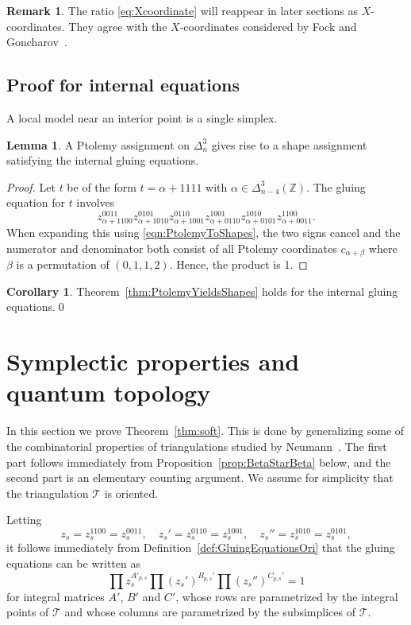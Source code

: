 \documentclass[12pt]{amsart}
\theoremstyle{definition}
\newtheorem{lemma}[theorem]{Lemma}
\newtheorem{remark}[theorem]{Remark}
\newtheorem{corollary}[theorem]{Corollary}
\numberwithin{equation}{section}
\def\Z{\mathbb{Z}}
\def\T{\mathcal{T}}
\begin{document}
\begin{remark}
The ratio \eqref{eq:Xcoordinate} will reappear in later sections as $X$-coordinates. They agree with the $X$-coordinates considered by Fock and Goncharov~\cite{FockGoncharov}. 
\end{remark}


\subsection{Proof for internal equations} \label{subsection:ProofForInternalEqn}
A local model near an interior point is a single simplex.
\begin{lemma}\label{lemma:InternalEquation} A Ptolemy assignment on $\Delta^3_n$ gives rise to a shape assignment satisfying the internal gluing equations.
\end{lemma}
\begin{proof}
Let $t$ be of the form $t=\alpha+1111$ with $\alpha\in\Delta^{3}_{n-4}(\Z)$. The gluing equation for $t$ involves
\begin{equation}
z^{0011}_{\alpha+1100}  z^{0101}_{\alpha+1010}    z^{0110}_{\alpha+1001}    z^{1001}_{\alpha+0110}     z^{1010}_{\alpha+0101}    z^{1100}_{\alpha+0011}.
\end{equation}
When expanding this using \eqref{eqn:PtolemyToShapes}, the two signs cancel and the numerator and denominator both consist of all Ptolemy coordinates $c_{\alpha+\beta}$ where $\beta$ is a permutation of $(0,1,1,2)$. Hence, the product is 1.
\end{proof}
\begin{corollary}
Theorem~\ref{thm:PtolemyYieldsShapes} holds for the internal gluing equations.\qed
\end{corollary}


\section{Symplectic properties and quantum topology}\label{sec:Symplectic}
In this section we prove Theorem~\ref{thm:soft}. This is done by generalizing some of the combinatorial properties of triangulations studied by Neumann~\cite{NeumannComb}. The first part follows immediately from Proposition~\ref{prop:BetaStarBeta} below, and the second part is an elementary counting argument. We assume for simplicity that the triangulation $\T$ is oriented. 

Letting
\begin{equation}
z_s=z_s^{1100}=z_s^{0011},\quad z_s'=z_s^{0110}=z_s^{1001},\quad z_s''=z_s^{1010}=z_s^{0101},
\end{equation}
it follows immediately from Definition~\ref{def:GluingEquationsOri} that the gluing equations can be written as 
\begin{equation}\label{eq:Unsimplified}
\prod z_s^{A'_{p,s}}\prod (z_s')^{B_{p,s}'}\prod (z_s'')^{C_{p,s}'}=1
\end{equation}
for integral matrices $A'$, $B'$ and $C'$, whose rows are parametrized by the integral points of $\T$ and whose columns are parametrized by the subsimplices of $\T$.
\end{document}
